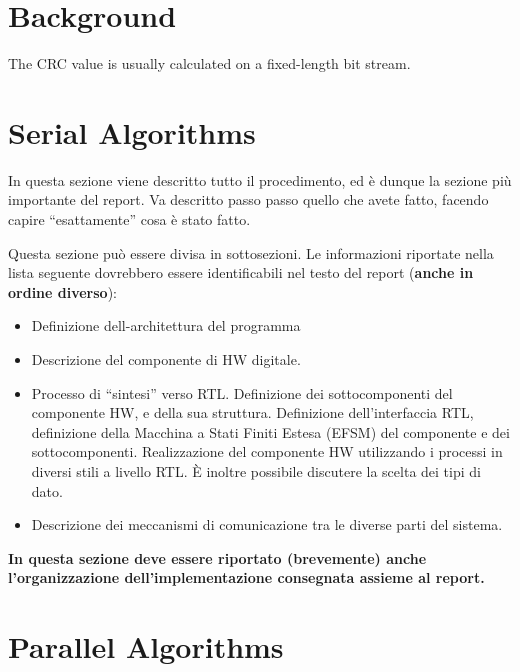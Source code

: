 \documentclass[]{IEEEtran}
\begin{document}
\section{Background}

The CRC value is usually calculated on a fixed-length
bit stream. 

\section{Serial Algorithms}

In questa sezione viene descritto tutto il procedimento, ed \`e dunque la sezione pi\`u importante del report. Va descritto passo passo quello che avete fatto, facendo capire ``esattamente'' cosa \`e stato fatto.

Questa sezione pu\`o essere divisa in sottosezioni. Le informazioni riportate nella lista seguente dovrebbero essere identificabili nel testo del report (\textbf{anche in ordine diverso}):
\begin{itemize}
\item Definizione dell-architettura del programma
\item Descrizione del componente di HW digitale.
\item Processo di ``sintesi'' verso RTL. Definizione dei sottocomponenti del componente HW, e della sua struttura. Definizione dell'interfaccia RTL, definizione della Macchina a Stati Finiti Estesa (EFSM) del componente e dei sottocomponenti. Realizzazione del componente HW utilizzando i processi in diversi stili a livello RTL. \`E inoltre possibile discutere la scelta dei tipi di dato.
\item Descrizione dei meccanismi di comunicazione tra le diverse parti del sistema.
\end{itemize}

\textbf{In questa sezione deve essere riportato (brevemente) anche l'organizzazione dell'implementazione consegnata assieme al report.}

\section{Parallel Algorithms}
\end{document}
